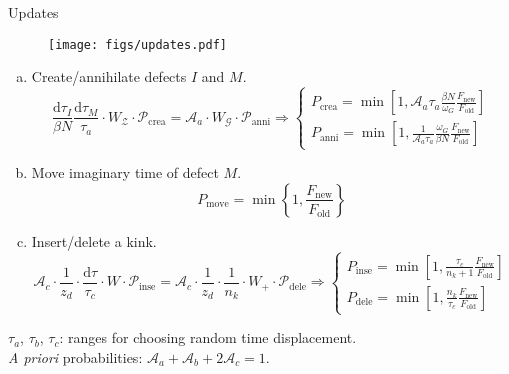 \documentclass[aspectratio=43]{beamer}
\begin{document}
\begin{frame}{Updates}
  \vspace{-3mm}
  \begin{figure}[htpb]
    \texttt{[image: figs/updates.pdf]}
  \end{figure}
  \vspace{-9mm}
  \footnotesize
  \begin{enumerate}[(a)]
    \item Create/annihilate defects $I$ and $M$.
      {\scriptsize\useshortskip\[
        \frac{\mathrm{d}\tau_I}{\beta N}\frac{\mathrm{d}\tau_M}{\tau_a}\cdot W_\mathcal{Z}\cdot\mathcal{P}_\text{crea} = \mathcal{A}_a\cdot W_\mathcal{G}\cdot\mathcal{P}_\text{anni}
        \Rightarrow
        \begin{cases}
          P_\text{crea} = \min \left[ 1, \mathcal{A}_a \tau_a \frac{\beta N}{\omega_G}\frac{F_\text{new}}{F_\text{old}} \right]\\
          P_\text{anni} = \min\left[ 1, \frac{1}{\mathcal{A}_a \tau_a}\frac{\omega_G}{\beta N}\frac{F_\text{new}}{F_\text{old}} \right]
        \end{cases}
      \]}
    \item Move imaginary time of defect $M$.
      {\scriptsize\useshortskip\[
        P_\text{move} = \min\left\{1, \frac{F_\text{new}}{F_\text{old}}\right\}
      \]}
    \item Insert/delete a kink.
      {\scriptsize\useshortskip\[
        \mathcal{A}_c\cdot\frac{1}{z_d}\cdot\frac{\mathrm{d}\tau}{\tau_c}\cdot W\cdot \mathcal{P}_\text{inse} = \mathcal{A}_c\cdot\frac{1}{z_d}\cdot\frac{1}{n_k}\cdot W_+\cdot \mathcal{P}_\text{dele}
        \Rightarrow
        \begin{cases}
          P_\text{inse} = \min\left[1, \frac{\tau_c}{n_k+1}\frac{F_\text{new}}{F_\text{old}}\right]\\
          P_\text{dele} = \min\left[1, \frac{n_k}{\tau_c}\frac{F_\text{new}}{F_\text{old}}\right]
        \end{cases}
      \]}
  \end{enumerate}
  \vspace{-3mm}
  $\tau_a$, $\tau_b$, $\tau_c$: ranges for choosing random time displacement.\\
  \textit{A priori} probabilities: $\mathcal{A}_a+\mathcal{A}_b+2\mathcal{A}_c = 1$.
\end{frame}
\end{document}

